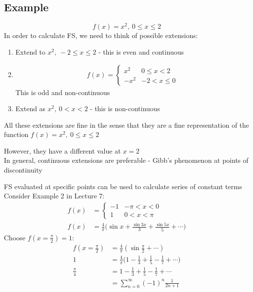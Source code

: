 \documentclass[a4paper, 11pt, normalem]{report}
\begin{document}
\subsection{Example}
\begin{equation*}
    f(x) = x^2,~ 0 \leq x \leq 2
\end{equation*}
In order to calculate FS, we need to think of possible extensions:
\begin{enumerate}
    \item Extend to $x^2,~ -2 \leq x \leq 2$ - this is even and continuous
    \item   \begin{gather*}
                f(x) =  \begin{cases}
                            x^2 & 0 \leq x < 2 \\
                            -x^2 & -2 < x \leq 0
                        \end{cases}
            \end{gather*}
            This is odd and non-continuous
    \item Extend as $x^2,~ 0 < x < 2$ - this is non-continuous
\end{enumerate}
All these extensions are fine in the sense that they are a fine representation of the function $f(x) = x^2,~ 0 \leq x \leq 2$

However, they have a different value at $x = 2$ \\
In general, continuous extensions are preferable - Gibb's phenomenon at points of discontinuity

FS evaluated at specific points can be used to calculate series of constant terms \\
Consider Example 2 in Lecture 7:
\begin{align*}
    f(x) &= \begin{cases}
                -1 & -\pi < x < 0 \\
                1 & 0 < x < \pi
            \end{cases} \\
    f(x) &= \frac{4}{\pi} \Big(\sin x + \frac{\sin 3x}{3} + \frac{\sin 5x}{5} + \cdots \Big)
\end{align*}
Choose $f(x = \frac{\pi}{2}) = 1$:
\begin{align*}
    f(x = \frac{\pi}{2}) &= \frac{4}{\pi} (\sin \frac{\pi}{2} + \cdots) \\
    1 &= \frac{4}{\pi} \Big(1 - \frac{1}{3} + \frac{1}{5} -\frac{1}{7} + \cdots \Big) \\
    \frac{\pi}{4} &= 1 - \frac{1}{3} + \frac{1}{5} -\frac{1}{7} + \cdots \\
    &= \sum_{n = 0}^{\infty} (-1)^n \frac{1}{2n + 1}
\end{align*}
\end{document}
